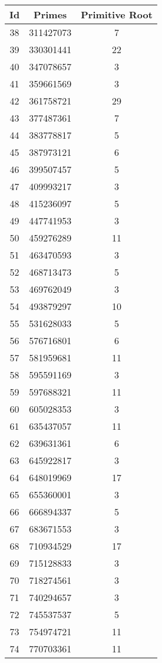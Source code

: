 \begin{spacing}{0.97}
\begin{tabular}{ccc}
\toprule
       Id & Primes & Primitive Root\\
 \midrule
 38 & 311427073 & 7\\
 39 & 330301441 & 22\\
 40 & 347078657 & 3\\
 41 & 359661569 & 3\\
 42 & 361758721 & 29\\
 43 & 377487361 & 7\\
 44 & 383778817 & 5\\
 45 & 387973121 & 6\\
 46 & 399507457 & 5\\
 47 & 409993217 & 3\\
 48 & 415236097 & 5\\
 49 & 447741953 & 3\\
 50 & 459276289 & 11\\
 51 & 463470593 & 3\\
 52 & 468713473 & 5\\
 53 & 469762049 & 3\\
 54 & 493879297 & 10\\
 55 & 531628033 & 5\\
 56 & 576716801 & 6\\
 57 & 581959681 & 11\\
 58 & 595591169 & 3\\
 59 & 597688321 & 11\\
 60 & 605028353 & 3\\
 61 & 635437057 & 11\\
 62 & 639631361 & 6\\
 63 & 645922817 & 3\\
 64 & 648019969 & 17\\
 65 & 655360001 & 3\\
 66 & 666894337 & 5\\
 67 & 683671553 & 3\\
 68 & 710934529 & 17\\
 69 & 715128833 & 3\\
 70 & 718274561 & 3\\
 71 & 740294657 & 3\\
 72 & 745537537 & 5\\
 73 & 754974721 & 11\\
 74 & 770703361 & 11\\
\bottomrule
\end{tabular}
\begin{tabular}{ccc}

\end{tabular}
\end{spacing}
